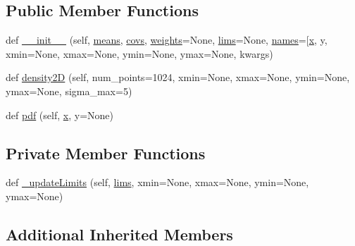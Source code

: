 \subsection*{Public Member Functions}
\begin{DoxyCompactItemize}
\item 
def \mbox{\hyperlink{classgetdist_1_1gaussian__mixtures_1_1Mixture2D_a5c0e8c7249a06e98e239a4340efedd19}{\+\_\+\+\_\+init\+\_\+\+\_\+}} (self, \mbox{\hyperlink{classgetdist_1_1gaussian__mixtures_1_1MixtureND_aeee57b3c06a515c91821b09866b52da3}{means}}, \mbox{\hyperlink{classgetdist_1_1gaussian__mixtures_1_1MixtureND_a51e91169ecb626b2ca59779abeed17b7}{covs}}, \mbox{\hyperlink{classgetdist_1_1gaussian__mixtures_1_1MixtureND_a7fbae73d771ec0e1ca1f80558ad3b08b}{weights}}=None, \mbox{\hyperlink{classgetdist_1_1gaussian__mixtures_1_1MixtureND_a0b9e4c4e0b3529e79cfa980507f8d2ea}{lims}}=None, \mbox{\hyperlink{classgetdist_1_1gaussian__mixtures_1_1MixtureND_ad26124d47b68d38fa8e90bc135769e6b}{names}}=\mbox{[}\textquotesingle{}\mbox{\hyperlink{plotTT_8m_a9336ebf25087d91c818ee6e9ec29f8c1}{x}}\textquotesingle{}, y, xmin=None, xmax=None, ymin=None, ymax=None, kwargs)
\item 
def \mbox{\hyperlink{classgetdist_1_1gaussian__mixtures_1_1Mixture2D_a75c659c0a74007a020773d90f324f6bc}{density2D}} (self, num\+\_\+points=1024, xmin=None, xmax=None, ymin=None, ymax=None, sigma\+\_\+max=5)
\item 
def \mbox{\hyperlink{classgetdist_1_1gaussian__mixtures_1_1Mixture2D_aa5f1666d0810f7e788881d776dfd797d}{pdf}} (self, \mbox{\hyperlink{plotTT_8m_a9336ebf25087d91c818ee6e9ec29f8c1}{x}}, y=None)
\end{DoxyCompactItemize}
\subsection*{Private Member Functions}
\begin{DoxyCompactItemize}
\item 
def \mbox{\hyperlink{classgetdist_1_1gaussian__mixtures_1_1Mixture2D_a605ecb70ffec33463e92a7c475acd158}{\+\_\+update\+Limits}} (self, \mbox{\hyperlink{classgetdist_1_1gaussian__mixtures_1_1MixtureND_a0b9e4c4e0b3529e79cfa980507f8d2ea}{lims}}, xmin=None, xmax=None, ymin=None, ymax=None)
\end{DoxyCompactItemize}
\subsection*{Additional Inherited Members}


